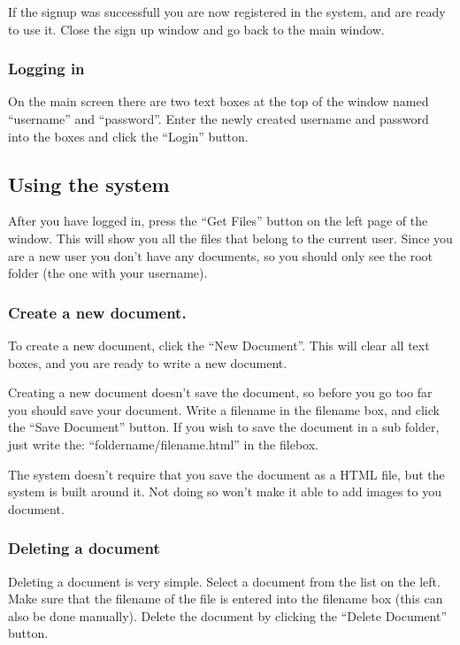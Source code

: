 \documentclass[11pt]{article}
\begin{document}
    If the signup was successfull you are now registered in the system, and are ready to use it. 
    Close the sign up window and go back to the main window.
\subsubsection{Logging in}
\label{sec-1-1-3}

    On the main screen there are two text boxes at the top of the window named ``username'' and ``password''.
    Enter the newly created username and password into the boxes and click the ``Login'' button.
\subsection{Using the system}
\label{sec-1-2}

   After you have logged in, press the ``Get Files'' button on the left page of the window. 
   This will show you all the files that belong to the current user. Since you are a new user you don't 
   have any documents, so you should only see the root folder (the one with your username).
\subsubsection{Create a new document.}
\label{sec-1-2-1}

    To create a new document, click the ``New Document''. This will clear all text boxes, and you are ready
    to write a new document.

    Creating a new document doesn't save the document, so before you go too far you should save your document.
    Write a filename in the filename box, and click the ``Save Document'' button.
    If you wish to save the document in a sub folder, just write the: ``foldername/filename.html'' in the filebox.

    The system doesn't require that you save the document as a HTML file, but the system is built around it. Not 
    doing so won't make it able to add images to you document.
\subsubsection{Deleting a document}
\label{sec-1-2-2}

    Deleting a document is very simple.
    Select a document from the list on the left. Make sure that the filename of the file is entered into the 
    filename box (this can also be done manually). Delete the document by clicking the ``Delete Document'' button.
\end{document}
